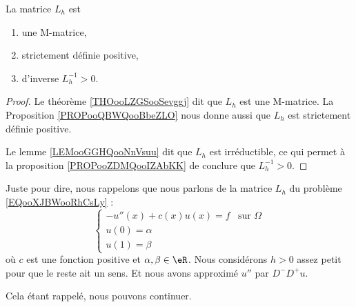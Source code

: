 \begin{proposition}     \label{PROPooOQJVooJMTkVM}
    La matrice \( L_h\) est 
    \begin{enumerate}
        \item
            une M-matrice,
        \item
            strictement définie positive,
        \item
             d'inverse \( L_h^{-1}>0\).
    \end{enumerate}
\end{proposition}

\begin{proof}
    Le théorème \ref{THOooLZGSooSevggj} dit que \( L_h\) est une M-matrice. La Proposition \ref{PROPooQBWQooBbeZLO} nous donne aussi que \( L_h\) est strictement définie positive.

    Le lemme \ref{LEMooGGHQooNnVsuu} dit que \( L_h\) est irréductible, ce qui permet à la proposition \ref{PROPooZDMQooIZAbKK} de conclure que \( L_h^{-1}>0\).
\end{proof}

Juste pour dire, nous rappelons que nous parlons de la matrice \( L_h\) du problème \eqref{EQooXJBWooRhCsLy} :
\begin{equation}                \label{EQooEUHQooWHRelr}
     \begin{cases}
         -u''(x)+c(x)u(x)=f    &   \text{sur } \Omega\\
         u(0)=\alpha\\
         u(1)=\beta
     \end{cases}
\end{equation}
où \( c\) est une fonction positive et \( \alpha,\beta\in \eR\). Nous considérons \( h>0\) assez petit pour que le reste ait un sens. Et nous avons approximé \( u''\) par \( D^-D^+u\).

Cela étant rappelé, nous pouvons continuer.

